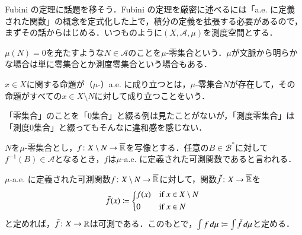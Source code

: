 Fubini の定理に話題を移そう．Fubini の定理を厳密に述べるには「a.e. に定義された関数」の概念を定式化した上で，積分の定義を拡張する必要があるので，まずその話からはじめる．いつものように$(X,\mathcal{A},\mu)$を測度空間とする．

\begin{defi}
$\mu(N)=0$を充たすような$N \in \mathcal{A}$のことを$\mu$-零集合という．$\mu$が文脈から明らかな場合は単に零集合とか測度零集合という場合もある．

$x\in X$に関する命題が（$\mu$-）a.e. に成り立つとは，$\mu$-零集合$N$が存在して，その命題がすべての$x \in X \setminus N$に対して成り立つことをいう．
\end{defi}

\begin{dig}
「零集合」のことを「0集合」と綴る例は見たことがないが，「測度零集合」は「測度0集合」と綴ってもそんなに違和感を感じない．
\end{dig}

\begin{defi}
$N$を$\mu$-零集合とし，$f \colon X \setminus N \to \overline{\mathbb{R}}$を写像とする．任意の$B \in \mathcal{B}^*$に対して$f^{-1}(B) \in \mathcal{A}$となるとき，$f$は$\mu$-a.e. に定義された可測関数であると言われる．

$\mu$-a.e. に定義された可測関数$f \colon X \setminus N \to \overline{\mathbb{R}}$に対して，関数$\tilde f \colon X \to \overline{\mathbb{R}}$を
\begin{equation}
\tilde f(x) \coloneqq \begin{dcases*}
    f(x) & if $x \in X \setminus N$ \\
    0 & if $x \in N$
  \end{dcases*}
\end{equation}と定めれば，$\tilde f \colon X \to \mathbb{R}$は可測である．このもとで，$\int f \mathop{}\!d\mu \coloneqq \int \tilde f \mathop{}\!d \mu$と定める．
\end{defi}


